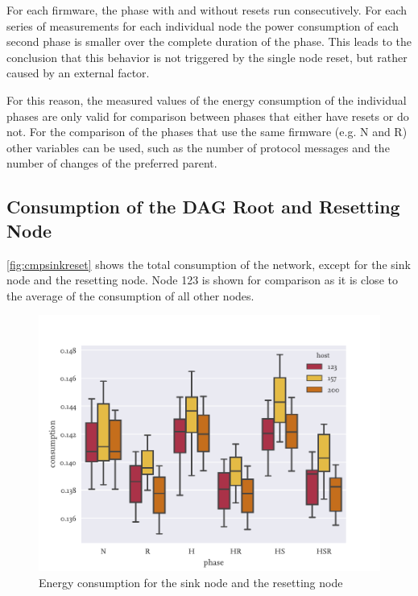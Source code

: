 For each firmware, the phase with and without resets run consecutively. For each
series of measurements for each individual node the power consumption of each
second phase is smaller over the complete duration of the phase. This leads to
the conclusion that this behavior is not triggered by the single node reset,
but rather caused by an external factor.

For this reason, the measured values of the energy consumption of the
individual phases are only valid for comparison between phases that either have
resets or do not. For the comparison of the phases that use the same firmware
(e.g. N and R) other variables can be used, such as the number of protocol
messages and the number of changes of the preferred parent.


\subsection{Consumption of the DAG Root and Resetting Node}

\autoref{fig:cmpsinkreset} shows the total consumption of the network, except for
the sink node and the resetting node. Node 123 is shown for comparison as it is
close to the average of the consumption of all other nodes.

\begin{figure}
  \centering
  \includegraphics[height=0.3\textheight]{../images/consumption-hosts.pdf}
  \caption{Energy consumption for the sink node and the resetting node}
  \label{fig:cmpsinkreset}
\end{figure}


